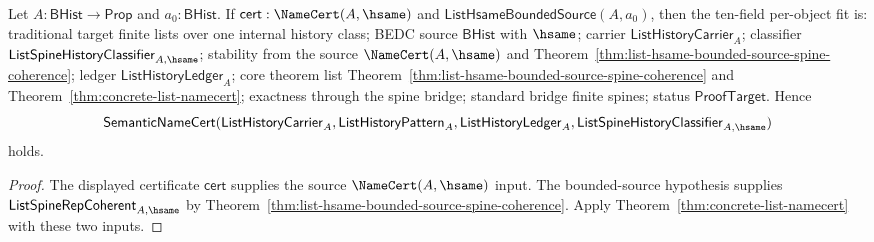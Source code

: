 \begin{corollary}
\label{thm:list-hsame-bounded-source-public-object-certificate}
Let $A:\mathsf{BHist}\to\mathsf{Prop}$ and $a_0:\mathsf{BHist}$. If
$\mathsf{cert}:\NameCert(A,\hsame)$ and
$\mathsf{ListHsameBoundedSource}(A,a_0)$, then the ten-field per-object fit is:
traditional target finite lists over one internal history class; BEDC source
$\mathsf{BHist}$ with $\hsame$; carrier $\mathsf{ListHistoryCarrier}_A$;
classifier $\mathsf{ListSpineHistoryClassifier}_{A,\hsame}$; stability from the
source $\NameCert(A,\hsame)$ and
Theorem~\ref{thm:list-hsame-bounded-source-spine-coherence}; ledger
$\mathsf{ListHistoryLedger}_A$; core theorem list
Theorem~\ref{thm:list-hsame-bounded-source-spine-coherence} and
Theorem~\ref{thm:concrete-list-namecert}; exactness through the spine bridge;
standard bridge finite spines; status $\mathsf{ProofTarget}$. Hence
$$
\mathsf{SemanticNameCert}(\mathsf{ListHistoryCarrier}_A,
\mathsf{ListHistoryPattern}_A,
\mathsf{ListHistoryLedger}_A,
\mathsf{ListSpineHistoryClassifier}_{A,\hsame})
$$
holds.
\end{corollary}
\begin{proof}
The displayed certificate $\mathsf{cert}$ supplies the source
$\NameCert(A,\hsame)$ input. The bounded-source hypothesis supplies
$\mathsf{ListSpineRepCoherent}_{A,\hsame}$ by
Theorem~\ref{thm:list-hsame-bounded-source-spine-coherence}. Apply
Theorem~\ref{thm:concrete-list-namecert} with these two inputs.
\end{proof}

